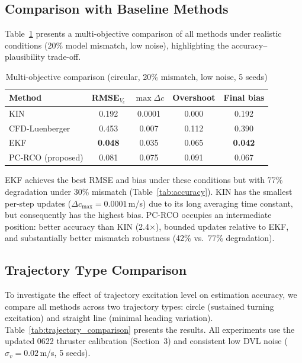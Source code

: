 \subsection{Comparison with Baseline Methods}

Table~\ref{tab:baseline_pareto} presents a multi-objective comparison of all methods under realistic conditions (20\% model mismatch, low noise), highlighting the accuracy--plausibility trade-off.

\begin{table}[h]
\centering
\caption{Multi-objective comparison (circular, 20\% mismatch, low noise, 5 seeds)}
\label{tab:baseline_pareto}
\begin{tabular}{lcccc}
\toprule
Method & RMSE$_{V_c}$ & $\max\Delta c$ & Overshoot & Final bias \\
\midrule
KIN                & 0.192 & 0.0001 & 0.000 & 0.192 \\
CFD-Luenberger     & 0.453 & 0.007 & 0.112 & 0.390 \\
EKF                & \textbf{0.048} & 0.035 & 0.065 & \textbf{0.042} \\
PC-RCO (proposed)  & 0.081 & 0.075 & 0.091 & 0.067 \\
\bottomrule
\end{tabular}
\end{table}

EKF achieves the best RMSE and bias under these conditions but with 77\% degradation under 30\% mismatch (Table~\ref{tab:accuracy}). KIN has the smallest per-step updates ($\Delta c_{\max}=0.0001$\,m/s) due to its long averaging time constant, but consequently has the highest bias. PC-RCO occupies an intermediate position: better accuracy than KIN (2.4$\times$), bounded updates relative to EKF, and substantially better mismatch robustness (42\% vs.\ 77\% degradation).

\subsection{Trajectory Type Comparison}

To investigate the effect of trajectory excitation level on estimation accuracy, we compare all methods across two trajectory types: circle (sustained turning excitation) and straight line (minimal heading variation). Table~\ref{tab:trajectory_comparison} presents the results. All experiments use the updated 0622 thruster calibration (Section~3) and consistent low DVL noise ($\sigma_v=0.02$\,m/s, 5 seeds).

